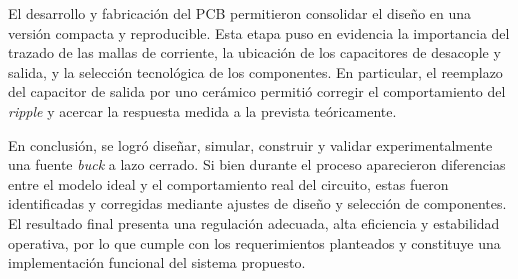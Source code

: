 El desarrollo y fabricaci\'on del PCB permitieron consolidar el dise\~no en una versi\'on compacta y reproducible. Esta etapa puso en evidencia la importancia del trazado de las mallas de corriente, la ubicaci\'on de los capacitores de desacople y salida, y la selecci\'on tecnol\'ogica de los componentes. En particular, el reemplazo del capacitor de salida por uno cer\'amico permiti\'o corregir el comportamiento del \textit{ripple} y acercar la respuesta medida a la prevista te\'oricamente.

En conclusi\'on, se logr\'o dise\~nar, simular, construir y validar experimentalmente una fuente \textit{buck} a lazo cerrado. Si bien durante el proceso aparecieron diferencias entre el modelo ideal y el comportamiento real del circuito, estas fueron identificadas y corregidas mediante ajustes de dise\~no y selecci\'on de componentes. El resultado final presenta una regulaci\'on adecuada, alta eficiencia y estabilidad operativa, por lo que cumple con los requerimientos planteados y constituye una implementaci\'on funcional del sistema propuesto.
